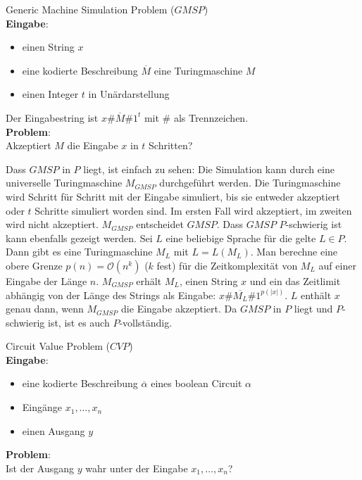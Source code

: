 \begin{problem}
    Generic Machine Simulation Problem ($GMSP$) \\
    \textbf{Eingabe}:
    \begin{itemize}
        \item einen String $x$
        \item eine kodierte Beschreibung $\overline{M}$ eine Turingmaschine $M$
        \item einen Integer $t$ in Unärdarstellung
    \end{itemize}
    Der Eingabestring ist $x\#\overline{M}\#1^t$ mit $\#$ als Trennzeichen. \\
    \textbf{Problem}: \\
    Akzeptiert $M$ die Eingabe $x$ in $t$ Schritten?
    \cite[S.215]{greenlaw}
\end{problem}
Dass $GMSP$ in $P$ liegt, ist einfach zu sehen:
Die Simulation kann durch eine universelle Turingmaschine $M_{GMSP}$
durchgeführt werden.
Die Turingmaschine wird Schritt für Schritt mit der Eingabe simuliert, bis sie
entweder akzeptiert oder $t$ Schritte simuliert worden sind.
Im ersten Fall wird akzeptiert, im zweiten wird nicht akzeptiert.
$M_{GMSP}$ entscheidet $GMSP$.
Dass $GMSP$ $P$-schwierig ist kann ebenfalls gezeigt werden.
Sei $L$ eine beliebige Sprache für die gelte $L \in P$.
Dann gibt es eine Turingmaschine $M_L$ mit $L = L(M_L)$.
Man berechne eine obere Grenze $p(n) = \mathcal{O}(n^k)$ ($k$ fest) für die
Zeitkomplexität von $M_L$ auf einer Eingabe der Länge $n$.
$M_{GMSP}$ erhält $M_L$, einen String $x$ und ein das Zeitlimit abhängig von der
Länge des Strings als Eingabe: $x\#\overline{M_L}\#1^{p(|x|)}$.
$L$ enthält $x$ genau dann, wenn $M_{GMSP}$ die Eingabe akzeptiert.
Da $GMSP$ in $P$ liegt und $P$-schwierig ist, ist es auch $P$-vollständig.
\cite[S.57ff]{greenlaw}


\begin{problem}
    Circuit Value Problem ($CVP$) \\
    \textbf{Eingabe}:
    \begin{itemize}
        \item eine kodierte Beschreibung $\overline{\alpha}$ eines
            boolean Circuit $\alpha$
        \item Eingänge $x_1, \ldots, x_n$
        \item einen Ausgang $y$
    \end{itemize}
    \textbf{Problem}: \\
    Ist der Ausgang $y$ wahr unter der Eingabe $x_1, \ldots, x_n$?
\end{problem}

